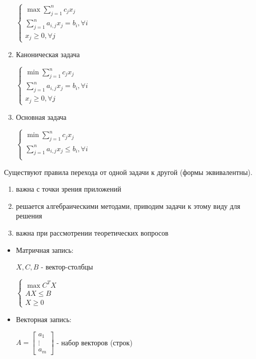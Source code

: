 \documentclass[11pt]{article}
\begin{document}
\begin{sloppypar}
\begin{enumerate}
    $\begin{cases}
      \max \sum_{j = 1}^n c_j x_j \\
      \sum_{j = 1}^n a_{i, j} x_j = b_i, \forall i \\
      x_j \geq 0, \forall j
    \end{cases}$
  \item Каноническая задача
  
    $\begin{cases}
      \min \sum_{j = 1}^n c_j x_j \\
      \sum_{j = 1}^n a_{i, j} x_j = b_i, \forall i \\
      x_j \geq 0, \forall j
    \end{cases}$
  \item Основная задача
    
    $\begin{cases}
      \min \sum_{j = 1}^n c_j x_j \\
      \sum_{j = 1}^n a_{i, j} x_j \leq b_i, \forall i \\
    \end{cases}$
\end{enumerate}

Существуют правила перехода от одной задачи к другой (формы эквивалентны).
\begin{enumerate}
  \item важна с точки зрения приложений
  \item решается алгебраическими методами, приводим задачи к этому виду для решения
  \item важна при рассмотрении теоретических вопросов
\end{enumerate}

\begin{itemize}
\item Матричная запись:

 $X, C, B$ - вектор-столбцы

$\begin{cases}
  \max C^T X \\
  AX \leq B \\
  X \geq 0
\end{cases}$

\item Векторная запись:

$A = \begin{bmatrix}
  a_1 \\ \vdots \\ a_m
\end{bmatrix}$ - набор векторов (строк) 


\end{itemize}
\end{sloppypar}
\end{document}
